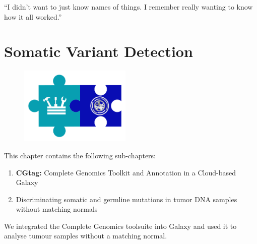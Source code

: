 \begin{savequote}[75mm]
“I didn’t want to just know names of things. I remember really wanting to know how it all worked.”
\end{savequote}

\chapter{Somatic Variant Detection}\label{chapter:virtualnormal}
\setcounter{figure}{-1}
\setcounter{table}{-1}
\setcounter{section}{-1}

\begin{figure}[t!]
\includegraphics[height=10em]{frontmatter/images/chapter-header-variants-tools.png}
\end{figure}
\setcounter{figure}{-1}
\setcounter{table}{-1}
\setcounter{section}{-1}


This chapter contains the following sub-chapters:

\begin{enumerate}[label=\ref{chapter:virtualnormal}.\arabic*]
\itemsep-0.5em
\item \textbf{CGtag:} Complete Genomics Toolkit and Annotation in a Cloud-based Galaxy
\item Discriminating somatic and germline mutations in tumor DNA samples without matching normals
\end{enumerate}

We integrated the Complete Genomics toolsuite into Galaxy and used it to analyse tumour samples without a matching normal.


